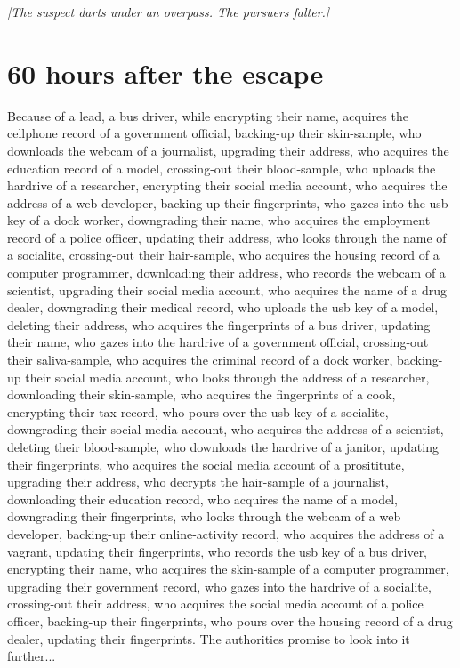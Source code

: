 \documentclass{report}
\begin{document}
\textit{[The suspect darts under an overpass. The pursuers falter.]}


\section*{60 \small{hours after the escape}}

Because of a lead, a bus driver, while encrypting their name, acquires the cellphone record of a government official, backing-up their skin-sample, who downloads the webcam of a journalist, upgrading their address, who acquires the education record of a model, crossing-out their blood-sample, who uploads the hardrive of a researcher, encrypting their social media account, who acquires the address of a web developer, backing-up their fingerprints, who gazes into the usb key of a dock worker, downgrading their name, who acquires the employment record of a police officer, updating their address, who looks through the name of a socialite, crossing-out their hair-sample, who acquires the housing record of a computer programmer, downloading their address, who records the webcam of a scientist, upgrading their social media account, who acquires the name of a drug dealer, downgrading their medical record, who uploads the usb key of a model, deleting their address, who acquires the fingerprints of a bus driver, updating their name, who gazes into the hardrive of a government official, crossing-out their saliva-sample, who acquires the criminal record of a dock worker, backing-up their social media account, who looks through the address of a researcher, downloading their skin-sample, who acquires the fingerprints of a cook, encrypting their tax record, who pours over the usb key of a socialite, downgrading their social media account, who acquires the address of a scientist, deleting their blood-sample, who downloads the hardrive of a janitor, updating their fingerprints, who acquires the social media account of a prosititute, upgrading their address, who decrypts the hair-sample of a journalist, downloading their education record, who acquires the name of a model, downgrading their fingerprints, who looks through the webcam of a web developer, backing-up their online-activity record, who acquires the address of a vagrant, updating their fingerprints, who records the usb key of a bus driver, encrypting their name, who acquires the skin-sample of a computer programmer, upgrading their government record, who gazes into the hardrive of a socialite, crossing-out their address, who acquires the social media account of a police officer, backing-up their fingerprints, who pours over the housing record of a drug dealer, updating their fingerprints. The authorities promise to look into it further...
\end{document}
